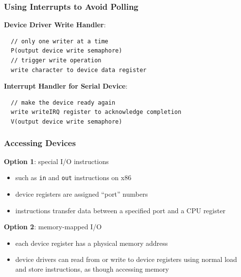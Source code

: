 \documentclass[12pt]{article}
\theoremstyle{plain}
\theoremstyle{definition}
\begin{document}
\subsubsection{Using Interrupts to Avoid Polling}
\textbf{Device Driver Write Handler}:
\begin{verbatim}
  // only one writer at a time
  P(output device write semaphore)
  // trigger write operation
  write character to device data register
\end{verbatim}
\medskip
\textbf{Interrupt Handler for Serial Device}:
\begin{verbatim}
  // make the device ready again
  write writeIRQ register to acknowledge completion
  V(output device write semaphore)
\end{verbatim}

\subsubsection{Accessing Devices}
\textbf{Option 1}: special I/O instructions
\begin{itemize}
  \item such as \texttt{in} and \texttt{out} instructions on x86
  \item device registers are assigned ``port'' numbers
  \item instructions transfer data between a specified port and a CPU register
\end{itemize}
\medskip
\textbf{Option 2}: memory-mapped I/O
\begin{itemize}
  \item each device register has a physical memory address
  \item device drivers can read from or write to device registers using normal load and store instructions, as though accessing memory
\end{itemize}
\end{document}
